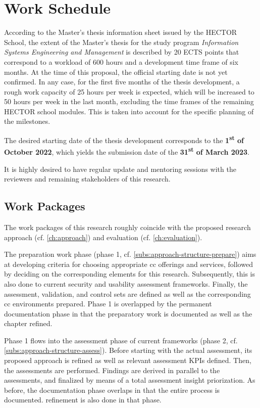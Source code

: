 
	\section{Work Schedule} \label{sec:organization-schedule}
	According to the Master's thesis information sheet issued by the HECTOR School, the extent of the Master's thesis for the study program \textit{Information Systems Engineering and Management} is described by 20 ECTS points that correspond to a workload of 600 hours and a development time frame of six months. At the time of this proposal, the official starting date is not yet confirmed. In any case, for the first five months of the thesis development, a rough work capacity of 25 hours per week is expected, which will be increased to 50 hours per week in the last month, excluding the time frames of the remaining HECTOR school modules. This is taken into account for the specific planning of the milestones.
	
	The desired starting date of the thesis development corresponds to the \textbf{1\textsuperscript{st} of October 2022}, which yields the submission date of the \textbf{31\textsuperscript{st} of March 2023}.
	
	It is highly desired to have regular update and mentoring sessions with the reviewers and remaining stakeholders of this research.
	
	\subsection{Work Packages}
	The work packages of this research roughly coincide with the proposed research approach (cf. \autoref{ch:approach}) and evaluation (cf. \autoref{ch:evaluation}).
	
	The preparation work phase (phase 1, cf. \autoref{subs:approach-structure-prepare}) aims at developing criteria for choosing appropriate \ac{cc} offerings and services, followed by deciding on the corresponding elements for this research. Subsequently, this is also done to current security and usability assessment frameworks. Finally, the assessment, validation, and control sets are defined as well as the corresponding \ac{cc} environments prepared. Phase 1 is overlapped by the permanent documentation phase in that the preparatory work is documented as well as the  chapter refined.
	
	Phase 1 flows into the assessment phase of current frameworks (phase 2, cf. \autoref{subs:approach-structure-assess}). Before starting with the actual assessment, its proposed approach is refined as well as relevant assessment KPIs defined. Then, the assessments are performed. Findings are derived in parallel to the assessments, and finalized by means of a total assessment insight priorization. As before, the documentation phase overlaps in that the entire process is documented.  refinement is also done in that phase.
	
